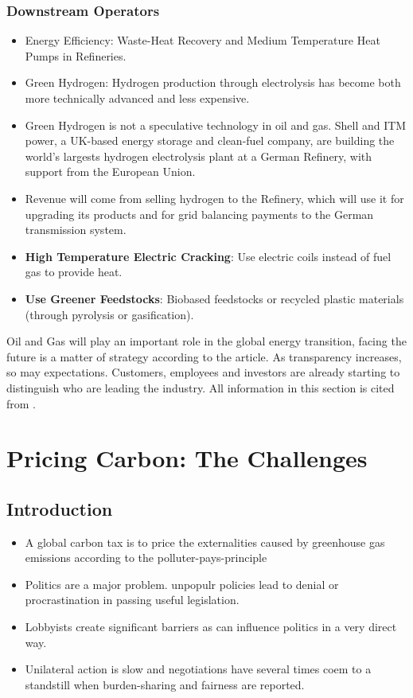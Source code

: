 \documentclass[12pt]{article}
\begin{document}
    \subsubsection{Downstream Operators}
    \begin{itemize}
        \item Energy Efficiency: Waste-Heat Recovery and Medium Temperature Heat Pumps in Refineries.
        \item Green Hydrogen: Hydrogen production through electrolysis has become both more technically advanced and less expensive.
        \item Green Hydrogen is not a speculative technology in oil and gas. Shell and ITM power, a UK-based energy storage and clean-fuel company, are building the world's largests hydrogen electrolysis plant at a German Refinery, with support from the European Union.
        \item Revenue will come from selling hydrogen to the Refinery, which will use it for upgrading its products and for grid balancing payments to the German transmission system.
        \item \textbf{High Temperature Electric Cracking}: Use electric coils instead of fuel gas to provide heat.
        \item \textbf{Use Greener Feedstocks}: Biobased feedstocks or recycled plastic materials (through pyrolysis or gasification).
    \end{itemize}
    Oil and Gas will play an important role in the global energy transition, facing the future is a matter of strategy according to the article. As transparency increases, so may expectations. Customers, employees and investors are already starting to distinguish who are leading the industry.
    All information in this section is cited from \cite{A:2}.
    \section{Pricing Carbon: The Challenges}
    \subsection{Introduction}
    \begin{itemize}
        \item A global carbon tax is to price the externalities caused by greenhouse gas emissions according to the polluter-pays-principle
        \item Politics are a major problem. unpopulr policies lead to denial or procrastination in passing useful legislation.
        \item Lobbyists create significant barriers as can influence politics in a very direct way.
        \item Unilateral action is slow and negotiations have several times coem to a standstill when burden-sharing and fairness are reported.
    \end{itemize}
\end{document}
